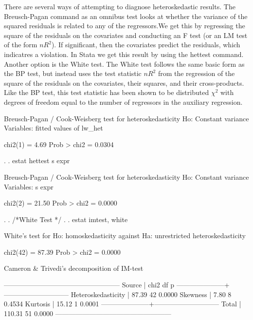 \documentclass[12pt]{article}
\begin{document}
There are several ways of attempting to diagnose heteroskedastic
results. The Breusch-Pagan command as an omnibus test looks at whether
the variance of the squared residuals is related to any of the
regressors.We get this by regressing the square of the residuals on
the covariates and conducting an F test (or an LM test of the form
$nR^2$). If significant, then the covariates predict the residuals,
which indicatres a violation.  In Stata we get this result by using
the hettest command. Another option is the White test. The White test
follows the same basic form as the BP test, but instead uses the test
statistic $nR^2$ from the regression of the square of the residuals on
the covariates, their squares, and their cross-products. Like the BP
test, this test statistic has been shown to be distributed $\chi^2$
with degrees of freedom equal to the number of regressors in the
auxiliary regression.

\begin{stlog}
  
Breusch-Pagan / Cook-Weisberg test for heteroskedasticity 
         Ho: Constant variance
         Variables: fitted values of lw_het

         chi2(1)      =     4.69
         Prob > chi2  =   0.0304

. 
. estat hettest s expr

Breusch-Pagan / Cook-Weisberg test for heteroskedasticity 
         Ho: Constant variance
         Variables: s expr

         chi2(2)      =    21.50
         Prob > chi2  =   0.0000

. 
. /*White Test */
.   
. estat imtest, white

White's test for Ho: homoskedasticity
         against Ha: unrestricted heteroskedasticity

         chi2(42)     =     87.39
         Prob > chi2  =    0.0000

Cameron & Trivedi's decomposition of IM-test

---------------------------------------------------
              Source |       chi2     df      p
---------------------+-----------------------------
  Heteroskedasticity |      87.39     42    0.0000
            Skewness |       7.80      8    0.4534
            Kurtosis |      15.12      1    0.0001
---------------------+-----------------------------
               Total |     110.31     51    0.0000
---------------------------------------------------


\end{stlog}
\end{document}
